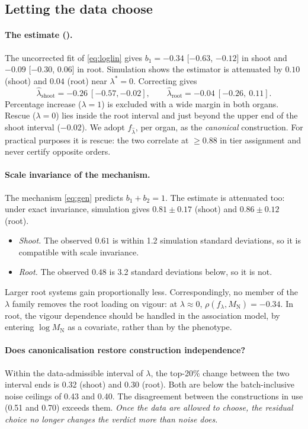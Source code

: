 \documentclass[10pt,twocolumn,a4paper]{article}
\theoremstyle{definition}
\theoremstyle{remark}
\newcommand{\MN}{{M_{\mathrm N}}}
\newcommand{\flam}{f_{\lambda}}
\newcommand{\lamhat}{\hat\lambda}
\begin{document}
\subsection{Letting the data choose}
\label{sec:res-can}

\paragraph{The estimate ().} The uncorrected fit of
\eqref{eq:loglin} gives $b_1=-0.34$ [$-0.63$, $-0.12$] in shoot and
$-0.09$ [$-0.30$, $0.06$] in root. Simulation shows the estimator is
attenuated by $0.10$ (shoot) and $0.04$ (root) near $\lambda^*=0$.
Correcting gives
\[
  \lamhat_{\mathrm{shoot}}=-0.26\ [-0.57,-0.02],\qquad
  \lamhat_{\mathrm{root}}=-0.04\ [-0.26,\ 0.11].
\]
Percentage increase ($\lambda=1$) is excluded with a wide margin in both
organs. Rescue ($\lambda=0$) lies inside the root interval and just
beyond the upper end of the shoot interval ($-0.02$). We adopt $f_{\lamhat}$, per organ, as
the \emph{canonical} construction. For practical purposes it is rescue:
the two correlate at $\ge0.88$ in tier assignment and never certify
opposite orders.

\paragraph{Scale invariance of the mechanism.} The mechanism
\eqref{eq:gen} predicts $b_1+b_2=1$. The estimate is attenuated too:
under exact invariance, simulation gives $0.81\pm0.17$ (shoot) and
$0.86\pm0.12$ (root).
\begin{itemize}[leftmargin=1.3em,itemsep=1pt]
  \item \emph{Shoot.} The observed $0.61$ is within 1.2 simulation
  standard deviations, so it is compatible with scale invariance.
  \item \emph{Root.} The observed $0.48$ is 3.2 standard deviations below,
  so it is not.
\end{itemize}
Larger root systems gain proportionally less. Correspondingly, no member
of the $\lambda$ family removes the root loading on vigour: at
$\lambda\approx0$, $\rho(\flam,\MN)=-0.34$. In root, the vigour
dependence should be handled in the association model, by entering
$\log\MN$ as a covariate, rather than by the phenotype.

\paragraph{Does canonicalisation restore construction independence?}
Within the data-admissible interval of $\lambda$, the top-20\% change
between the two interval ends is 0.32 (shoot) and 0.30 (root). Both are
below the batch-inclusive noise ceilings of 0.43 and 0.40. The
disagreement between the constructions in use (0.51 and 0.70) exceeds
them. \emph{Once the data are allowed to choose, the residual choice no
longer changes the verdict more than noise does.}
\end{document}
